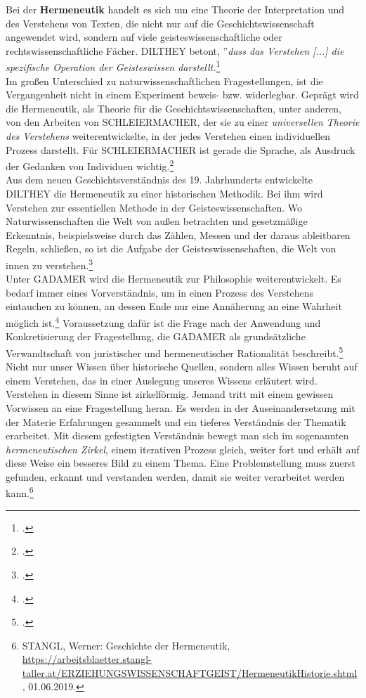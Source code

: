 \documentclass[12pt,a4paper]{article}
\begin{document}
Bei der \textbf{Hermeneutik} handelt es sich um eine Theorie der Interpretation und des Verstehens von Texten, die nicht nur auf die Geschichtswissenschaft angewendet wird, sondern auf viele geisteswissenschaftliche oder rechtswissenschaftliche Fächer.
DILTHEY betont, ''\textit{dass das Verstehen [...] die spezifische Operation der Geisteswissen darstellt.}\footcite[Vgl.][S.82]{ficara2015hermeneutik}
\\
Im großen Unterschied zu naturwissenschaftlichen Fragestellungen, ist die Vergangenheit nicht in einem Experiment beweis- bzw. widerlegbar. Geprägt wird die Hermeneutik, als Theorie für die Geschichtswissenschaften, unter anderen, von den Arbeiten von SCHLEIERMACHER, der sie zu einer \textit{universellen Theorie des Verstehens} weiterentwickelte, in der jedes Verstehen einen individuellen Prozess darstellt. Für SCHLEIERMACHER ist gerade die Sprache, als Ausdruck der Gedanken von Individuen wichtig.\footcite[Vgl.][S.72-81]{ficara2015hermeneutik} 
\\
Aus dem neuen Geschichtsverständnis des 19. Jahrhunderts entwickelte DILTHEY die Hermeneutik zu einer historischen Methodik. Bei ihm wird Verstehen zur essentiellen Methode in der Geisteswissenschaften. Wo Naturwissenschaften die Welt von außen betrachten und gesetzmäßige Erkenntnis, beispielsweise durch das Zählen, Messen und der daraus ableitbaren Regeln, schließen, so ist die Aufgabe der Geisteswissenschaften, die Welt von innen zu verstehen.\footcite[][S.82-83]{ficara2015hermeneutik}
\\
Unter GADAMER wird die Hermeneutik zur Philosophie weiterentwickelt. Es bedarf immer eines Vorverständnis, um in einen Prozess des Verstehens eintauchen zu können, an dessen Ende nur eine Annäherung an eine Wahrheit möglich ist.\footcite[][S.19-30]{schulz2010neuere} Voraussetzung dafür ist die Frage nach der Anwendung und Konkretisierung der Fragestellung, die GADAMER als grundsätzliche Verwandtschaft von juristischer und hermeneutischer Rationalität beschreibt.\footcite[][S.176-178]{ficara2015hermeneutik}
\\
Nicht nur unser Wissen über historische Quellen, sondern alles Wissen beruht auf einem Verstehen, das in einer Auslegung unseres Wissens erläutert wird. Verstehen in diesem Sinne ist zirkelförmig. Jemand tritt mit einem gewissen Vorwissen an eine Fragestellung heran. Es werden in der Auseinandersetzung mit der Materie Erfahrungen gesammelt und ein tieferes Verständnis der Thematik erarbeitet. Mit diesem gefestigten Verständnis bewegt man sich im sogenannten  \textit{hermeneutischen Zirkel}, einem iterativen Prozess gleich, weiter fort und erhält auf diese Weise ein besseres Bild zu einem Thema. Eine Problemstellung muss zuerst gefunden, erkannt und verstanden werden, damit sie weiter verarbeitet werden kann.\footnote{STANGL, Werner: Geschichte der Hermeneutik, \protect\url{https://arbeitsblaetter.stangl-taller.at/ERZIEHUNGSWISSENSCHAFTGEIST/HermeneutikHistorie.shtml}, 01.06.2019.}
\end{document}
